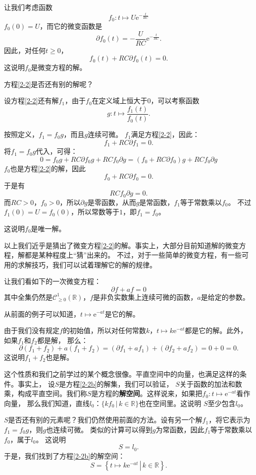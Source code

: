 \documentclass[12pt,UTF8]{ctexbook}
\newcommand{\e}{\mathrm{e}}
\theoremstyle{definition}
\theoremstyle{plain}
\begin{document}
让我们考虑函数
$$f_0: t\mapsto U\e^{-\frac{t}{RC}}$$
$f_0(0) = U$，而它的微变函数是
$$\partial f_0(t) = -\frac{U}{RC} \e^{-\frac{t}{RC}}. $$
因此，对任何$t\geqslant 0$，
$$ f_0(t) + RC\partial f_0(t) = 0.$$
这说明$f_0$是微变方程的解。

方程\eqref{2-2}是否还有别的解呢？

设方程\eqref{2-2}还有解$f_1$，由于$f_0$在定义域上恒大于$0$，可以考察函数
$$ g : t \mapsto \frac{f_1(t)}{f_0(t)}. $$

按照定义，$f_1 = f_0 g$，而且$g$连续可微。
$f_1$满足方程\eqref{2-2}，因此：
$$ f_1 + RC \partial f_1 = 0.$$
将$f_1 = f_0 g$代入，可得：
$$ 0 = f_0 g + RC \partial f_0 g + RC f_0 \partial g = (f_0 + RC \partial f_0) g + RC f_0 \partial g $$
$f_0$也是方程\eqref{2-2}的解，因此
$$ f_0 + RC\partial f_0 = 0.$$
于是有
$$ RC f_0 \partial g = 0. $$
而$RC>0$，$f_0>0$，所以$\partial g$是零函数，从而$g$是常函数，$f_1$等于常数乘以$f_0$。
不过$f_1(0) = U = f_0(0)$，所以常数等于$1$，即$f_1 = f_0$。

这说明$f_0$是唯一解。

以上我们近乎是猜出了微变方程\eqref{2-2}的解。事实上，大部分目前知道解的微变方程，解都是某种程度上“猜”出来的。
不过，对于一些简单的微变方程，有一些可用的求解技巧，我们可以试着理解它的解的规律。

让我们看如下的一次微变方程：
\begin{equation}
    \partial f + af = 0 \label{2-2b}
\end{equation}
其中全集仍然是$\mathcal{C}^1_{\geqslant 0}(\mathbb{R})$，$f$是非负实数集上连续可微的函数，$a$是给定的参数。

从前面的例子可以知道，$t\mapsto \e^{-at}$是它的解。

由于我们没有规定$f$的初始值，所以对任何常数$k$，$t\mapsto k\e^{-at}$都是它的解。此外，如果$f_1$和$f_2$都是解，
那么：
$$ \partial (f_1 + f_2) + a(f_1 + f_2) = (\partial f_1 + af_1) + (\partial f_2 + af_2) = 0 + 0 = 0. $$
这说明$f_1 + f_2$也是解。

这个性质和我们之前学过的某个概念很像。平直空间中的向量，也满足这样的条件。事实上，
设$S$是方程\eqref{2-2b}的解集，我们可以验证，
$S$关于函数的加法和数乘，构成平直空间。我们称$S$是方程的\textbf{解空间}。这样说来，如果把$f_0:t\mapsto \e^{-at}$看作向量，
那么我们知道，直线$l_0$：$\{kf_0 \, | \, k\in\mathbb{R}\}$也在空间里。这说明
$S$至少包含$l_0$。

$S$是否还有别的元素呢？我们仍然使用前面的方法。设有另一个解$f_1$，将它表示为$f_1 = f_0 g$，则$g$也连续可微。
类似的计算可以得到$g$为常函数，因此$f_1$等于常数乘以$f_0$，属于$l_0$。
这说明
$$S = l_0.$$
于是，我们找到了方程\eqref{2-2b}的解空间：
$$S = \left\{\left.t\mapsto k\e^{-at} \, \right| \, k\in\mathbb{R}\right\}.$$
\end{document}
